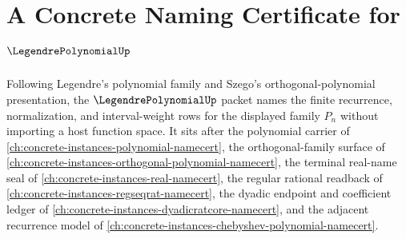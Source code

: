 \chapter{A Concrete Naming Certificate for $\LegendrePolynomialUp$}
\label{ch:concrete-instances-legendre-polynomial-namecert}

Following Legendre's polynomial family and Szego's orthogonal-polynomial presentation, the $\LegendrePolynomialUp$ packet names the finite recurrence, normalization, and interval-weight rows for the displayed family $P_n$ without importing a host function space. It sits after the polynomial carrier of \autoref{ch:concrete-instances-polynomial-namecert}, the orthogonal-family surface of \autoref{ch:concrete-instances-orthogonal-polynomial-namecert}, the terminal real-name seal of \autoref{ch:concrete-instances-real-namecert}, the regular rational readback of \autoref{ch:concrete-instances-regseqrat-namecert}, the dyadic endpoint and coefficient ledger of \autoref{ch:concrete-instances-dyadicratcore-namecert}, and the adjacent recurrence model of \autoref{ch:concrete-instances-chebyshev-polynomial-namecert}.

